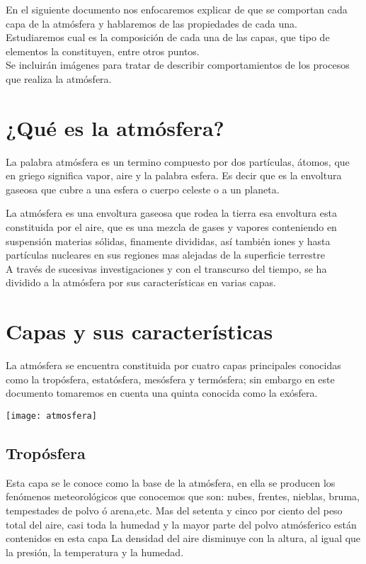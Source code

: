 \documentclass[12pt,letterpaper]{article}
\begin{document}
\begin{portada}
En el siguiente documento nos enfocaremos explicar de que se comportan cada capa de la atmósfera y hablaremos de las propiedades de cada una.
\\Estudiaremos cual es la composición de cada una de las capas, que tipo de elementos la constituyen, entre otros puntos.
\\Se incluirán imágenes para tratar de describir comportamientos de los procesos que realiza la atmósfera.
\section{¿Qué es la atmósfera?}

La palabra atmósfera es un termino compuesto por dos partículas, átomos, que en griego significa vapor, aire y la palabra esfera. Es decir que es la envoltura gaseosa que cubre a una esfera o cuerpo celeste o a un planeta.

La atmósfera es una envoltura gaseosa que rodea la tierra esa envoltura esta constituida por el aire, que es una mezcla de gases y vapores conteniendo en suspensión materias sólidas, finamente divididas, así también iones y hasta partículas nucleares en sus regiones mas alejadas de la superficie terrestre
\\A través de sucesivas investigaciones y con el transcurso del tiempo, se ha dividido a la atmósfera por sus características en varias capas.

\section{Capas y sus características}
La atmósfera se encuentra constituida por cuatro capas principales conocidas como la tropósfera, estatósfera, mesósfera y termósfera; sin embargo en este documento tomaremos en cuenta una quinta conocida como la exósfera.
\begin{center}
\texttt{[image: atmosfera]}
\end{center}

\subsection{Tropósfera}
Esta capa se le conoce como la base de la atmósfera, en ella se producen los fenómenos meteorológicos que conocemos que son: nubes, frentes, nieblas, bruma, tempestades de polvo ó arena,etc. Mas del setenta y cinco por ciento del peso total del aire, casi toda la humedad y la mayor parte del polvo atmósferico están contenidos en esta capa La densidad del aire disminuye con la altura, al igual que la presión, la temperatura y la humedad.


\end{portada}
\end{document}
